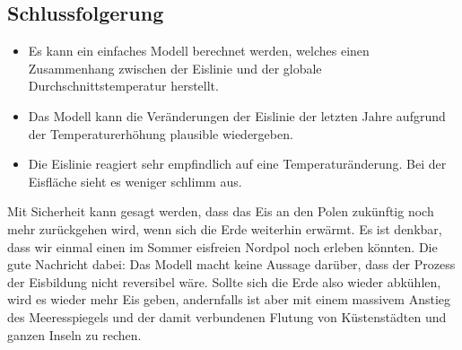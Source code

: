 \begin{refsection}
\section{Schlussfolgerung}
\begin{itemize}
	\item Es kann ein einfaches Modell berechnet werden, welches einen Zusammenhang zwischen der Eislinie und der globale Durchschnittstemperatur herstellt.
	\item Das Modell kann die Veränderungen der Eislinie der letzten Jahre aufgrund der Temperaturerhöhung plausible wiedergeben.
	\item Die Eislinie reagiert sehr empfindlich auf eine Temperaturänderung. Bei der Eisfläche sieht es weniger schlimm aus. 
\end{itemize}
Mit Sicherheit kann gesagt werden, dass das Eis an den Polen zukünftig noch mehr zurückgehen wird, wenn sich die Erde weiterhin erwärmt. Es ist denkbar, dass wir einmal einen im Sommer eisfreien Nordpol noch erleben könnten. Die gute Nachricht dabei: Das Modell macht keine Aussage darüber, dass der Prozess der Eisbildung nicht reversibel wäre. Sollte sich die Erde also wieder abkühlen, wird es wieder mehr Eis geben, andernfalls ist aber mit einem massivem Anstieg des Meeresspiegels und der damit verbundenen Flutung von Küstenstädten und ganzen Inseln zu rechen.
\printbibliography[heading=subbibliography]
\end{refsection}
